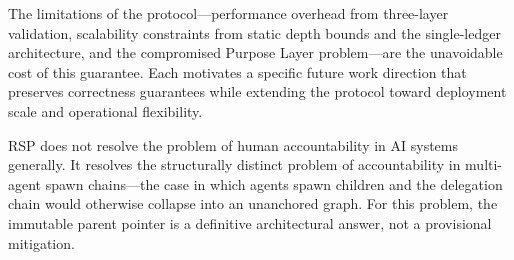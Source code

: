 The limitations of the protocol—performance overhead from three-layer validation, scalability constraints from static depth bounds and the single-ledger architecture, and the compromised Purpose Layer problem—are the unavoidable cost of this guarantee. Each motivates a specific future work direction that preserves correctness guarantees while extending the protocol toward deployment scale and operational flexibility.

RSP does not resolve the problem of human accountability in AI systems generally. It resolves the structurally distinct problem of accountability in multi-agent spawn chains—the case in which agents spawn children and the delegation chain would otherwise collapse into an unanchored graph. For this problem, the immutable parent pointer is a definitive architectural answer, not a provisional mitigation.
